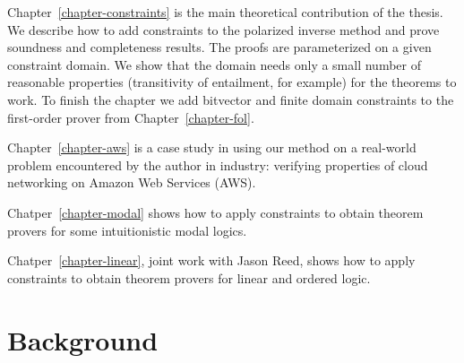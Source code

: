Chapter~\ref{chapter-constraints} is the main theoretical contribution of the
thesis.  We describe how to add constraints to the polarized inverse method and
prove soundness and completeness results.  The proofs are parameterized on a
given constraint domain.  We show that the domain needs only a small number of
reasonable properties (transitivity of entailment, for example) for the theorems
to work.  To finish the chapter we add bitvector and finite domain constraints
to the first-order prover from Chapter~\ref{chapter-fol}.

Chapter~\ref{chapter-aws} is a case study in using our method on a real-world
problem encountered by the author in industry: verifying properties of
cloud networking on Amazon Web Services (AWS).

Chatper~\ref{chapter-modal} shows how to apply constraints to obtain theorem
provers for some intuitionistic modal logics.

Chatper~\ref{chapter-linear}, joint work with Jason Reed, shows how to apply
constraints to obtain theorem provers for linear and ordered logic.

\section{Background}











